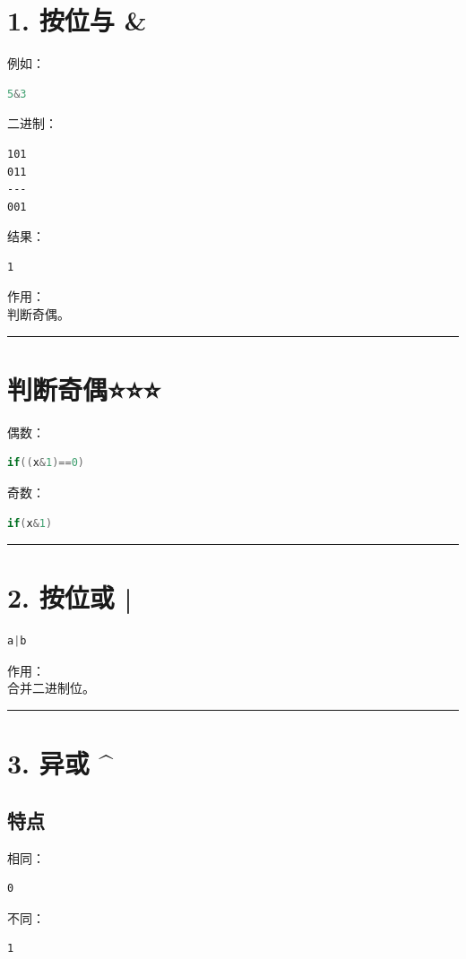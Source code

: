 \documentclass[9pt,twocolumn]{extarticle}
\begin{document}
\section{1. 按位与 \&}

例如：
\begin{lstlisting}[language=C++]
5&3
\end{lstlisting}
二进制：
\begin{lstlisting}
101
011
---
001
\end{lstlisting}
结果：
\begin{lstlisting}
1
\end{lstlisting}
作用：\\
判断奇偶。

\noindent\rule{\linewidth}{0.4pt}

\section{判断奇偶⭐⭐⭐}

偶数：
\begin{lstlisting}[language=C++]
if((x&1)==0)
\end{lstlisting}
奇数：
\begin{lstlisting}[language=C++]
if(x&1)
\end{lstlisting}

\noindent\rule{\linewidth}{0.4pt}

\section{2. 按位或 |}
\begin{lstlisting}[language=C++]
a|b
\end{lstlisting}
作用：\\
合并二进制位。

\noindent\rule{\linewidth}{0.4pt}

\section{3. 异或 \^}

\subsection{特点}
相同：
\begin{lstlisting}
0
\end{lstlisting}
不同：
\begin{lstlisting}
1
\end{lstlisting}
\end{document}
